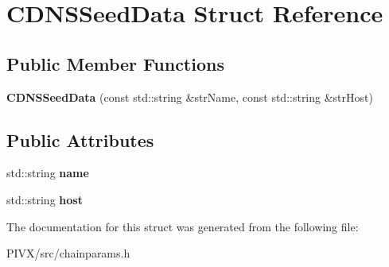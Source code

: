 \hypertarget{struct_c_d_n_s_seed_data}{}\section{C\+D\+N\+S\+Seed\+Data Struct Reference}
\label{struct_c_d_n_s_seed_data}
\subsection*{Public Member Functions}
\begin{DoxyCompactItemize}
\item 
\mbox{\label{struct_c_d_n_s_seed_data_a4152b594beb9800fb7611e3c47f03499}} 
{\bfseries C\+D\+N\+S\+Seed\+Data} (const std\+::string \&str\+Name, const std\+::string \&str\+Host)
\end{DoxyCompactItemize}
\subsection*{Public Attributes}
\begin{DoxyCompactItemize}
\item 
\mbox{\label{struct_c_d_n_s_seed_data_a2cf084b163340bd62b67e765799f1fdd}} 
std\+::string {\bfseries name}
\item 
\mbox{\label{struct_c_d_n_s_seed_data_a70f5da8568016651cfb7ec7dbf01b3f0}} 
std\+::string {\bfseries host}
\end{DoxyCompactItemize}


The documentation for this struct was generated from the following file\+:\begin{DoxyCompactItemize}
\item 
P\+I\+V\+X/src/chainparams.\+h\end{DoxyCompactItemize}
